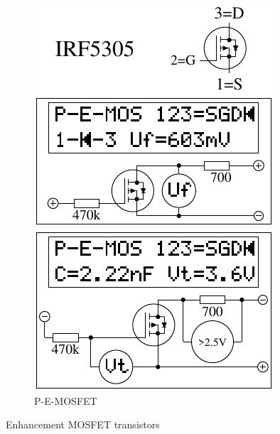\begin{figure}[H]
\begin{subfigure}[b]{.5\textwidth}
    \centering
    \includegraphics[width=1.\textwidth]{../FIG/MOS_IRF5305.pdf}
    \caption{P-E-MOSFET}
    \label{fig:MOS-P-E}
  \end{subfigure}
  \caption{Enhancement MOSFET transistors}
\end{figure}



